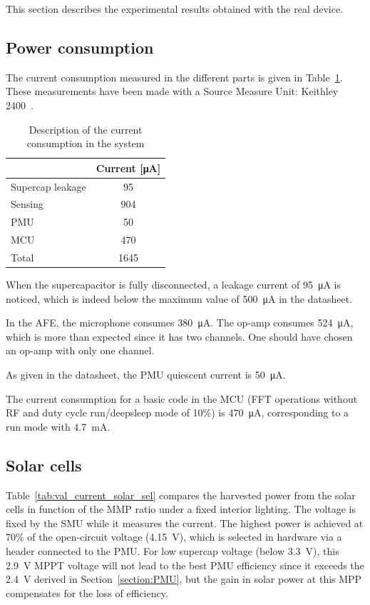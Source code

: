 \documentclass{EPL-master-thesis-covers-EN}
\begin{document}
This section describes the experimental results obtained with the real device.

\subsection*{Power consumption}

The current consumption measured in the different parts is given in Table~\ref{tab:val_current_cons}. These measurements have been made with a Source Measure Unit: Keithley 2400~\cite{Keithley}.

\begin{table}[H]
\centering
\begin{tabular}{lc}
\toprule
                     & Current [\si{\micro A}]  \\ \midrule
 Supercap leakage    & 95                       \\
 Sensing             & 904                     \\
 PMU                 & 50                       \\
 MCU                 & 470                      \\ \midrule
 Total               & 1645                     \\ \bottomrule
\end{tabular}
\caption{Description of the current consumption in the system}
\label{tab:val_current_cons}
\end{table}

When the supercapacitor is fully disconnected, a leakage current of \SI{95}{\micro A} is noticed, which is indeed below the maximum value of \SI{500}{\micro A} in the datasheet.

In the AFE, the microphone consumes \SI{380}{\micro A}. The op-amp consumes \SI{524}{\micro A}, which is more than expected since it has two channels. One should have chosen an op-amp with only one channel.

As given in the datasheet, the PMU quiescent current is \SI{50}{\micro A}.

The current consumption for a basic code in the MCU (FFT operations without RF and  duty cycle run/deepsleep mode of 10\%) is \SI{470}{\micro A}, corresponding to a run mode with \SI{4.7}{mA}.

\subsection*{Solar cells}

Table~\ref{tab:val_current_solar_sel} compares the harvested power from the solar cells in function of the MMP ratio under a fixed interior lighting. The voltage is fixed by the SMU while it measures the current. The highest power is achieved at 70\% of the open-circuit voltage (\SI{4.15}{V}), which is selected in hardware via a header connected to the PMU. For low supercap voltage (below \SI{3.3}{V}), this \SI{2.9}{V} MPPT voltage will not lead to the best PMU efficiency since it exceeds the \SI{2.4}{V} derived in Section~\ref{section:PMU}, but the gain in solar power at this MPP compensates for the loss of efficiency.
\end{document}
